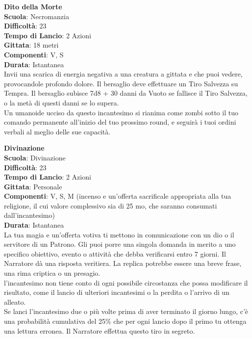 \begin{multicols}{2}
\medskip\textbf{Dito della Morte}\\
\textbf{Scuola}: Necromanzia\\
\textbf{Difficoltà}:  23\\
\textbf{Tempo di Lancio}: 2 Azioni\\
\textbf{Gittata}: 18 metri\\
\textbf{Componenti}: V, S\\
\textbf{Durata}: Istantanea\\
Invii una scarica di energia negativa a una creatura a gittata e che puoi vedere, provocandole profondo dolore. Il bersaglio deve effettuare un Tiro Salvezza su Tempra. Il bersaglio subisce 7d8 + 30 danni da Vuoto se fallisce il Tiro Salvezza, o la metà di questi danni se lo supera.\\
Un umanoide ucciso da questo incantesimo si rianima come zombi sotto il tuo comando permanente all'inizio del tuo prossimo round, e seguirà i tuoi ordini verbali al meglio delle sue capacità.

\medskip\textbf{Divinazione}\\
\textbf{Scuola}: Divinazione\\
\textbf{Difficoltà}:  23\\
\textbf{Tempo di Lancio}: 2 Azioni\\
\textbf{Gittata}: Personale\\
\textbf{Componenti}: V, S, M (incenso e un'offerta sacrificale appropriata alla tua religione, il cui valore complessivo sia di 25 mo, che saranno consumati dall'incantesimo)\\
\textbf{Durata}: Istantanea\\
La tua magia e un'offerta votiva ti mettono in comunicazione con un dio o il servitore di un Patrono. Gli puoi porre una singola domanda in merito a uno specifico obiettivo, evento o attività che debba verificarsi entro 7 giorni. Il Narratore dà una risposta veritiera. La replica potrebbe essere una breve frase, una rima criptica o un presagio. \\
l'incantesimo non tiene conto di ogni possibile circostanza che possa modificare il risultato, come il lancio di ulteriori incantesimi o la perdita o l’arrivo di un alleato.\\
Se lanci l'incantesimo due o più volte prima di aver terminato il giorno lungo, c’è una probabilità cumulativa del 25\% che per ogni lancio dopo il primo tu ottenga una lettura erronea. Il Narratore effettua questo tiro in segreto. 


\end{multicols}
